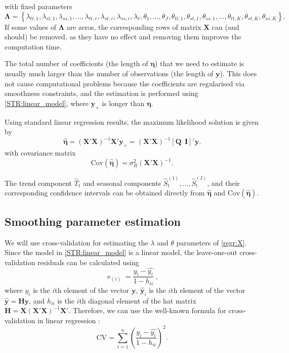 \documentclass[11pt,a4paper,]{article}
\begin{document}
with fixed parameters
\[
  \bm{\Lambda} = \left\{\lambda_{tt,1}, \lambda_{st,1}, \lambda_{ss,1},
    \dots, \lambda_{tt,r}, \lambda_{st,r}, \lambda_{ss,r}, \lambda_\ell,
    \theta_1, \dots, \theta_J, \theta_{tt,1}, \theta_{st,1}, \theta_{ss,1},
    \dots, \theta_{tt,K}, \theta_{st,K}, \theta_{ss,K}
  \right\}.
\]
If some values of \(\bm{\Lambda}\) are zeros, the corresponding rows of matrix \(\bm{X}\) can (and should) be removed, as they have no effect and removing them improves the computation time.

The total number of coefficients (the length of \(\bm{\eta}\)) that we need to estimate is usually much larger than the number of observations (the length of \(\bm{y}\)). This does not cause computational problems because the coefficients are regularised via smoothness constraints, and the estimation is performed using \eqref{STR:linear_model}, where \(\bm{y}_{+}\) is longer than \(\bm{\eta}\).

Using standard linear regression results, the maximum likelihood solution is given by
\begin{equation}
  \label{STR:solution}
  \hat{\bm\eta} = (\bm{X}'\bm{X})^{-1}\bm{X}'\bm{y}_{+} = (\bm{X}'\bm{X})^{-1}[\bm{Q} ~~ \bm{I}]'\bm{y} .
\end{equation}
with covariance matrix
\begin{equation}
  \label{STR:beta_covar2}
  \text{Cov}(\hat{\bm\eta}) = \sigma_R^2 (\bm{X}'\bm{X})^{-1} .
\end{equation}

The trend component \(\hat{T}_t\) and seasonal components \(\hat{S}_t^{(1)},\dots,\hat{S}_t^{(I)}\), and their corresponding confidence intervals can be obtained directly from \(\hat{\bm\eta}\) and \(\text{Cov}(\hat{\bm\eta})\).

\hypertarget{sec:find_params}{%
\subsection{Smoothing parameter estimation}\label{sec:find_params}}

We will use cross-validation for estimating the \(\lambda\) and \(\theta\) parameters of \eqref{regr:X}. Since the model in \eqref{STR:linear_model} is a linear model, the leave-one-out cross-validation residuals can be calculated \autocite[see][]{seber2012linear} using
\begin{equation}
  \label{FindLambdas:residuals}
  \operatorname{e}_{(i)} = \frac{y_i-\hat{y_i}}{1-h_{ii}}\ ,
\end{equation}
where \(y_i\) is the \(i\)th element of the vector \(\bm{y}\), \(\hat{\bm y}_i\) is the \(i\)th element of the vector \(\hat{\bm y} = \bm{H}\bm{y}\), and \(h_{ii}\) is the \(i\)th diagonal element of the hat matrix \(\bm{H} = \bm{X}(\bm{X}'\bm{X})^{-1}\bm{X}'\).
Therefore, we can use the well-known formula for cross-validation in linear regression \autocite[see, for example,][p.45]{RWC02}:
\begin{equation}
  \label{FindLambdas:CV}
  \text{CV} = \sum_{i=1}^{n}\left(\frac{y_i-\hat{y_i}}{1-h_{ii}}\right)^2.
\end{equation}
\end{document}
